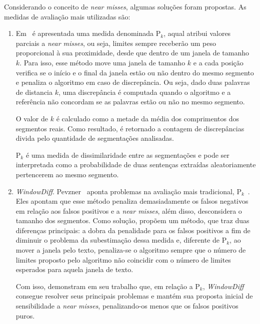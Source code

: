 Considerando o conceito de \textit{near misses}, algumas soluções foram propostas. As medidas de avaliação mais utilizadas são:

\begin{enumerate}

	\item Em~\cite{Beeferman1999} é apresentada uma medida denominada P$_k$, aqual atribui valores parciais a \textit{near misses}, ou seja, limites sempre receberão um peso proporcional à sua proximidade, desde que dentro de um janela de tamanho~$k$.
%
Para isso, esse método move uma janela de tamanho $k$ e a cada posição verifica se o início e o final da janela estão ou não dentro do mesmo segmento e penaliza o algoritmo em caso de discrepância. Ou seja, dado duas palavras de distancia $k$, uma discrepância é computada quando o algoritmo e a referência não concordam se as palavras estão ou não no mesmo segmento.

O valor de $k$ é calculado como a metade da média dos comprimentos dos segmentos reais. Como resultado, é retornado a contagem de discrepâncias divida pelo quantidade de segmentações analisadas. 

P$_k$ é uma medida de dissimilaridade entre as segmentações e pode ser interpretada como a probabilidade de duas sentenças extraídas aleatoriamente pertencerem ao mesmo segmento.

\item \textit{WindowDiff}. Pevzner~\cite{Pevzner2002} aponta problemas na avaliação mais tradicional, P$_k$~\cite{Beeferman1999}. Eles apontam que esse método penaliza demasiadamente os falsos negativos em relação aos falsos positivos e a \textit{near misses}, além disso, desconsidera o tamanho dos segmentos. Como solução, propõem um método, que traz duas diferenças principais: a dobra da penalidade para os falsos positivos a fim de diminuir o problema da subestimação dessa medida e, diferente de P$_k$, ao mover a janela pelo texto, penaliza-se o algoritmo sempre que o número de limites proposto pelo algoritmo não coincidir com o número de limites esperados para aquela janela de texto. 

Com isso, demonstram em seu trabalho que, em relação a P$_k$, \textit{WindowDiff} consegue resolver seus principais problemas e mantém sua proposta inicial de sensibilidade a \textit{near misses}, penalizando-os menos que os falsos positivos puros.


\end{enumerate}













